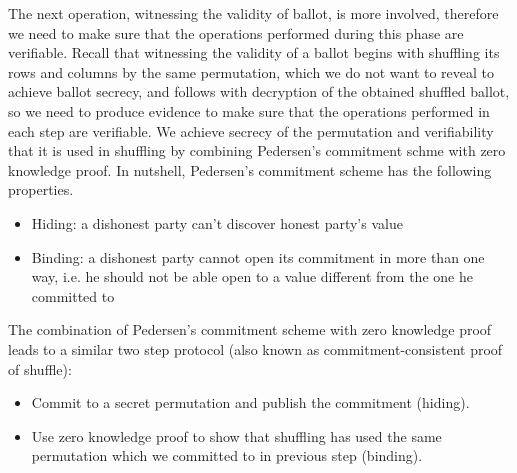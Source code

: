\documentclass{llncs}
\begin{document}
The next operation, witnessing the validity of ballot, 
is more involved, therefore we need to make 
sure that the operations performed during this phase are verifiable. 
Recall that witnessing 
the validity of a ballot begins with shuffling its rows and columns 
by the same permutation, which
we do not want to reveal to achieve ballot secrecy, and follows with 
decryption  of the obtained shuffled ballot, so 
we need to produce evidence 
to make sure that the operations performed in each step 
are verifiable. We achieve secrecy of the permutation and 
verifiability that it is used in shuffling by combining 
Pedersen's commitment schme \cite{Pederson} with zero knowledge proof.
In nutshell, Pedersen's commitment scheme has the following properties. 
\begin{itemize}
\item Hiding: a dishonest party can't discover honest party's value 
\item Binding: a dishonest party cannot open its commitment in more  
	 	than one way, i.e. he should not be able open to a value 
	 	different from the one he committed to 
\end{itemize}

The combination of Pedersen's commitment scheme 
with zero knowledge proof leads to a similar two step protocol (also known 
as commitment-consistent proof of shuffle)\cite{Wikstrom:2009:CPS}:
\begin{itemize}
\item Commit to a secret permutation and publish the commitment (hiding).
\item Use zero knowledge proof to show that shuffling has used 
      the same permutation which we committed to in previous step (binding).
\end{itemize}  
\end{document}
